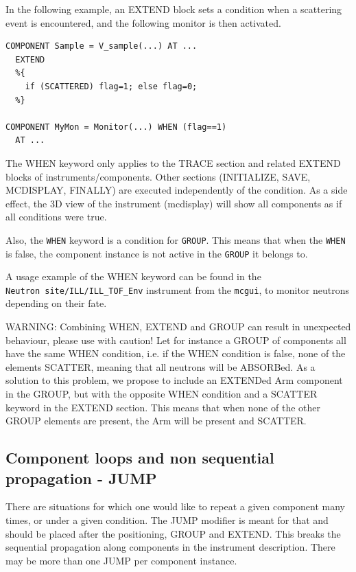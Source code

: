 In the following example, an EXTEND block sets a condition when a scattering
event is encountered, and the following monitor is then activated.
\begin{verbatim}
COMPONENT Sample = V_sample(...) AT ...
  EXTEND
  %{
    if (SCATTERED) flag=1; else flag=0;
  %}

COMPONENT MyMon = Monitor(...) WHEN (flag==1)
  AT ...
\end{verbatim}

The WHEN keyword only applies to the TRACE section and related EXTEND blocks of
instruments/components. Other sections (INITIALIZE, SAVE, MCDISPLAY, FINALLY)
are executed independently of the condition. As a side effect, the 3D view of
the instrument (mcdisplay) will show all components as if all conditions were
true.

Also, the \verb+WHEN+ keyword is a condition for \verb+GROUP+. This means that
when the \verb+WHEN+ is false, the component instance is not active in the
\verb+GROUP+ it belongs to.

A usage example of the WHEN keyword can be found in the \\
\verb+Neutron site/ILL/ILL_TOF_Env+ instrument from the \verb+mcgui+, to monitor
neutrons depending on their fate.


WARNING: Combining WHEN, EXTEND and GROUP can result in unexpected behaviour,
please use with caution! Let for instance a GROUP of components all have the
same WHEN condition, i.e. if the WHEN condition is false, none of the elements
SCATTER, meaning that all neutrons will be ABSORBed. As a solution to this
problem, we propose to include an EXTENDed Arm component in the GROUP, but with
the opposite WHEN condition and a SCATTER keyword in the EXTEND section. This
means that when none of the other GROUP elements are present, the Arm will be
present and SCATTER.


\subsection{Component loops and non sequential propagation - JUMP}
\label{s:instrdefs-extend-jump}

There are situations for which one would like to repeat a given component many
times, or under a given condition. The JUMP modifier is meant for that and
should be placed after the positioning, GROUP and EXTEND. This breaks the
sequential propagation along components in the instrument description. There may
be more than one JUMP per component instance.

